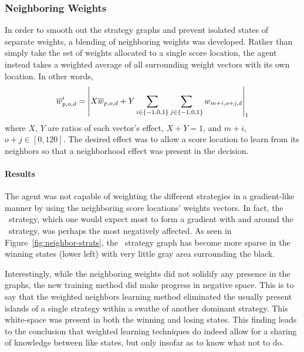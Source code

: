 

\subsubsection*{Neighboring Weights}
\label{sec:findings-expts-neighbors}


In order to smooth out the strategy graphs
and prevent isolated states of separate weights,
a blending of neighboring weights was developed.
%
Rather than simply take the set of weights allocated to a single score location,
the agent instead takes a weighted average of all surrounding weight vectors
with its own location.
%
In other words,
\[
    \wvecm'_{p,o,d} = %
    \left|
    X\wvecm_{p,o,d} +
    Y \sum_{i\in\{-1,0,1\}} \sum_{j\in\{-1,0,1\}} w_{m+i,o+j,d}
    \right|_1
\]
where $X$, $Y$ are ratios of each vector's effect, $X+Y = 1$,
and $m+i$, $o+j \in [0,120]$.
%
The desired effect was to allow a score location to learn from its neighbors
so that a neighborhood effect was present in the decision.


\paragraph*{Results}





The agent was not capable of weighting the different strategies in a
gradient-like manner
by using the neighboring score locations' weights vectors.
%
In fact,
the \handmaxavg\ strategy,
which one would expect most to form a gradient with and around the
\handmaxmin\ strategy,
was perhaps the most negatively affected.
%
As seen in Figure~\ref{fig:neighbor-strats},
the \handmaxavg\ strategy graph has become more sparse in the winning
states (lower left)
with very little gray area surrounding the black.

Interestingly,
while the neighboring weights did not solidify any presence in the graphs,
the new training method did make progress in negative space.
%
This is to say that
the weighted neighbors learning method eliminated the usually present islands
of a single strategy within a swathe of another dominant strategy.
%
This white-space was present in both the winning and losing states.
%
This finding leads to the conclusion that weighted learning techniques
do indeed allow for a sharing of knowledge between like states,
but only insofar as to know what not to do.

